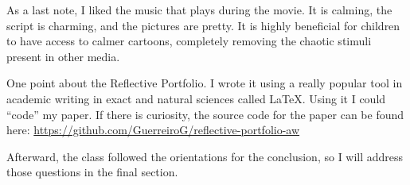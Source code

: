 As a last note, I liked the music that plays during the movie. It is calming, the script is charming, and the pictures are pretty. It is highly beneficial for children to have access to calmer cartoons, completely removing the chaotic stimuli present in other media.

One point about the Reflective Portfolio. I wrote it using a really popular tool in academic writing in exact and natural sciences called \LaTeX. Using it I could ``code'' my paper. If there is curiosity, the source code for the paper can be found here: \url{https://github.com/GuerreiroG/reflective-portfolio-aw}

Afterward, the class followed the orientations for the conclusion, so I will address those questions in the final section.
